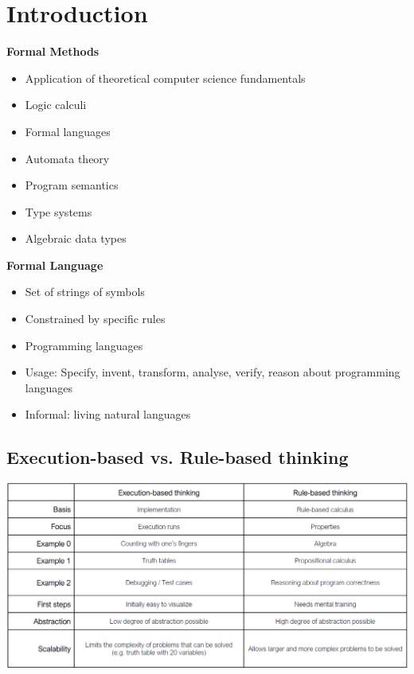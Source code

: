 
\section{Introduction}
\textbf{Formal Methods}
\begin{itemize}
    \item Application of theoretical computer science fundamentals
    \item Logic calculi
    \item Formal languages
    \item Automata theory
    \item Program semantics
    \item Type systems
    \item Algebraic data types
\end{itemize}

\textbf{Formal Language}
\begin{itemize}
    \item Set of strings of symbols
    \item Constrained by specific rules
    \item Programming languages
    \item Usage: Specify, invent, transform, analyse, verify, reason about programming languages
    \item Informal: living natural languages
\end{itemize}

\subsection{Execution-based vs. Rule-based thinking}
\includegraphics[width=\linewidth]{../img/execution_rule_thinking.png}

